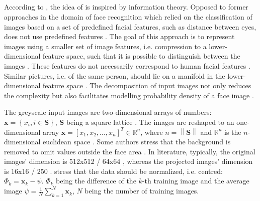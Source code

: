 \subsection{\eigenfaces{}}\label{subsec:eigenface}

According to \citeauthor{eigenfaces1991}, the idea of \eigenfaces{} is inspired by information theory.
Opposed to former approaches in the domain of face recognition which relied on the classification of images based on a set of predefined facial features, such as distance between eyes,
\eigenfaces{} does not use predefined features \cite{eigenfaces1991}.
The goal of this approach is to represent images using a smaller set of image features, i.e. compression to a lower-dimensional feature space, 
such that it is possible to distinguish between the images \cite{eigenfaces1991, eigenfaces2013}.
These features do not necessarily correspond to human facial features \cite{eigenfaces1991}.
Similar pictures, i.e. of the same person, should lie on a manifold in the lower-dimensional feature space \cite{face-recognition2008}.
The decomposition of input images not only reduces the complexity but also facilitates modelling probability density of a face image \cite{face-recognition2008}.

The greyscale input images are two-dimensional arrays of numbers: $\textbf{x} = \left\{ x_i, i \in \textbf{S} \right\}$, $\textbf{S}$ being a square lattice \cite{eigenfaces1997, eigenfaces1991}.
The images are reshaped to an one-dimensional array $\textbf{x} = \left[x_1, x_2, ..., x_n  \right]^{T} \in \mathbb{R}^{n}$, 
where $n = \left\| \textbf{S} \right\|$ and $\mathbb{R}^{n}$ is the $n$-dimensional euclidean space \cite{eigenfaces1997}.
Some authors stress that the background is removed to omit values outside the face area \cite{eigenfaces1991}.
In literature, typically, the original images' dimension is 512x512 \cite{eigenfaces1991}/ 64x64 \cite{face-recognition2020}, 
whereas the projected images' dimension is 16x16 \cite{eigenfaces1991}/ 250 \cite{face-recognition2020}.
\citeauthor{eigenfaces1991} stress that the data should be normalized, i.e. centred: 
$\Phi_{k} = \mathbf{x}_{k} - {\psi }$. 
$\Phi_{k}$ being the difference of the $k$-th training image and the average image $\psi = \frac{1}{N}\sum_{k=1}^{N}\textbf{x}_{k}$, $N$ being the number of training images.

